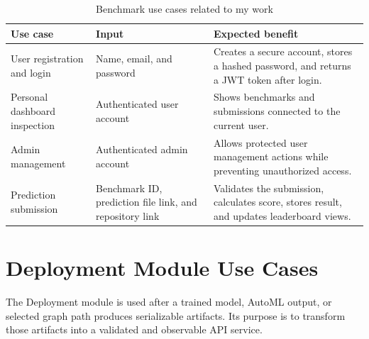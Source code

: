 \documentclass[12pt,a4paper,oneside]{report}
\begin{document}
\begin{table}[H]
\centering
\small
\caption{Benchmark use cases related to my work}
\label{tab:benchmark-use-cases-individual}
\begin{tabularx}{\textwidth}{p{}p{}X}
\toprule
\textbf{Use case} & \textbf{Input} & \textbf{Expected benefit} \\
\midrule
User registration and login &
Name, email, and password &
Creates a secure account, stores a hashed password, and returns a JWT token after login. \\
\midrule
Personal dashboard inspection &
Authenticated user account &
Shows benchmarks and submissions connected to the current user. \\
\midrule
Admin management &
Authenticated admin account &
Allows protected user management actions while preventing unauthorized access. \\
\midrule
Prediction submission &
Benchmark ID, prediction file link, and repository link &
Validates the submission, calculates score, stores result, and updates leaderboard views. \\
\bottomrule
\end{tabularx}
\end{table}

\section{Deployment Module Use Cases}
The Deployment module is used after a trained model, AutoML output, or selected graph path produces serializable artifacts. Its purpose is to transform those artifacts into a validated and observable API service.
\end{document}
